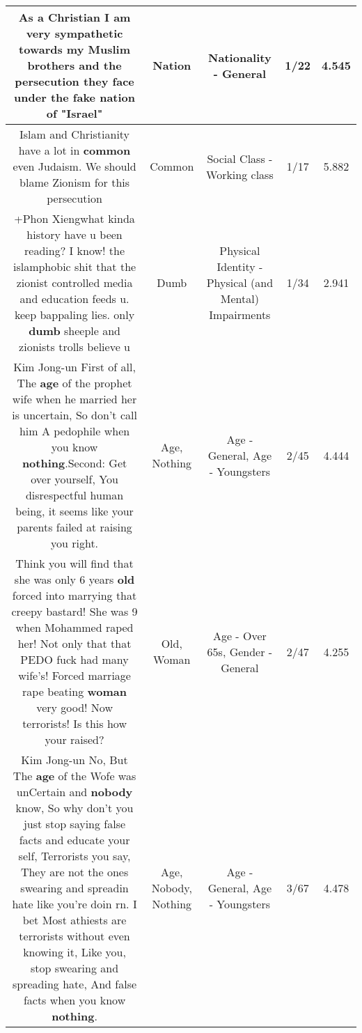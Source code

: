 \documentclass[11pt]{article}
\newlength\mylength
\begin{document}
\begin{center}
\begin{longtable}{|C{.65\mylength}|C{.30\mylength}|C{.12\mylength}|C{.12\mylength}|C{.12\mylength}|}
  \small As a Christian I am very sympathetic towards my Muslim brothers and the persecution they face under the fake \textbf{nation} of "Israel"\normalsize   & Nation & Nationality - General & 1/22 & 4.545 \\  \hline
  \small Islam and Christianity have a lot in \textbf{common} even Judaism. We should blame Zionism for this persecution\normalsize   & Common & Social Class - Working class & 1/17 & 5.882 \\  \hline
  \small +Phon Xiengwhat kinda history have u been reading? I know! the islamphobic shit that the zionist controlled media and education feeds u. keep bappaling lies. only \textbf{dumb} sheeple and zionists trolls believe u\normalsize   & Dumb & Physical Identity - Physical (and Mental) Impairments & 1/34 & 2.941 \\  \hline
  \small Kim Jong-un First of all, The \textbf{age} of the prophet wife when he married her is uncertain, So don't call him A pedophile when you know \textbf{nothing}.Second: Get over yourself, You disrespectful human being, it seems like your parents failed at raising you right.\normalsize   & Age, Nothing & Age - General, Age - Youngsters & 2/45 & 4.444 \\  \hline
  \small Think you will find that she was only 6 years \textbf{old} forced into marrying that creepy bastard! She was 9 when Mohammed raped her! Not only that that PEDO fuck had many wife's! Forced marriage rape beating \textbf{woman} very good! Now terrorists! Is this how your raised?\normalsize   & Old, Woman & Age - Over 65s, Gender - General & 2/47 & 4.255 \\  \hline
  \small Kim Jong-un No, But The \textbf{age} of the Wofe was unCertain and \textbf{nobody} know, So why don't you just stop saying false facts and educate your self, Terrorists you say, They are not the ones swearing and spreadin hate like you're doin rn. I bet Most athiests are terrorists without even knowing it, Like you, stop swearing and spreading hate, And false facts when you know \textbf{nothing}.\normalsize   & Age, Nobody, Nothing & Age - General, Age - Youngsters & 3/67 & 4.478 \\  \hline

\end{longtable}
\end{center}
\end{document}
